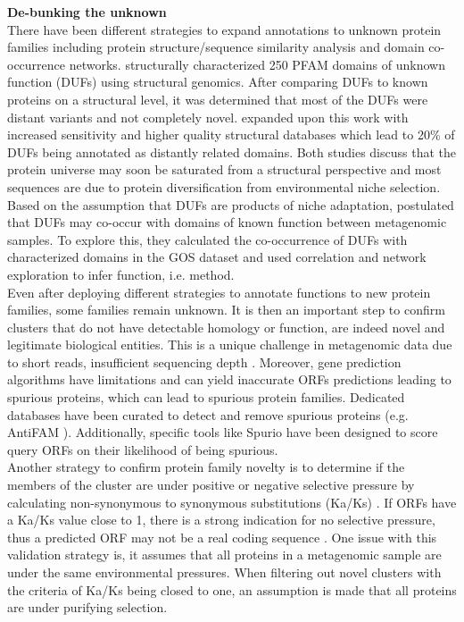 \textbf{De-bunking the unknown}\\

There have been different strategies to expand annotations to unknown protein families including protein structure/sequence similarity analysis and domain co-occurrence networks. \cite{Jaroszewski_2009} structurally characterized 250 PFAM domains of unknown function (DUFs) using structural genomics. After comparing DUFs to known proteins on a structural level, it was determined that most of the DUFs were distant variants and not completely novel. \cite{Mudgal_2015} expanded upon this work with increased sensitivity and higher quality structural databases which lead to 20\% of DUFs being annotated as distantly related domains. Both studies discuss that the protein universe may soon be saturated from a structural perspective and most  sequences are due to protein diversification from environmental niche selection. Based on the assumption that DUFs are products of niche adaptation, \cite{Buttigieg_2013} postulated that DUFs may co-occur with domains of known function between metagenomic samples. To explore this, they calculated the co-occurrence of DUFs with characterized domains in the GOS dataset and used correlation and network exploration to infer function, i.e.  method.\\

Even after deploying different strategies to annotate functions to new protein families, some families remain unknown. It is then an important step to confirm clusters that do not have detectable homology or function, are indeed novel and legitimate biological entities. This is a unique challenge in metagenomic data due to short reads, insufficient sequencing depth \citep{Parks_2011, Barrientos_Somarribas_2018}. Moreover, gene prediction algorithms have limitations and can yield inaccurate ORFs predictions leading to spurious proteins, which can lead to spurious protein families. Dedicated databases have been curated to detect and remove spurious proteins (e.g. AntiFAM \citep{Eberhardt_2012}). Additionally, specific tools like Spurio \citep{H_ps_2018} have been designed to score query ORFs on their likelihood of being spurious.\\

Another strategy to confirm protein family novelty is to determine if the members of the cluster are under positive or negative selective pressure by calculating non-synonymous to synonymous substitutions (Ka/Ks) \citep{Yooseph_2007, Barrientos_Somarribas_2018}. If ORFs have a Ka/Ks value close to 1, there is a strong indication for no selective pressure, thus a predicted ORF may not be a real coding sequence \citep{Nekrutenko_2001}. One issue with this validation strategy is, it assumes that all proteins in a metagenomic sample are under the same environmental pressures. When filtering out novel clusters with the criteria of Ka/Ks being closed to one, an assumption is made that all proteins are under purifying selection.

